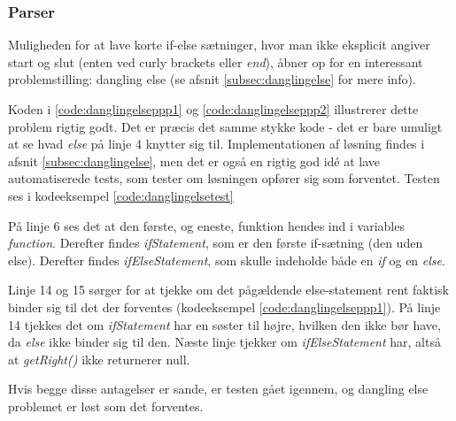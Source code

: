 \subsubsection{Parser}
\label{subsec:parser}

Muligheden for at lave korte if-else sætninger, hvor man ikke eksplicit angiver start og slut (enten ved curly brackets  eller \textit{end}), åbner op for en interessant problemstilling: dangling else (se afsnit \ref{subsec:danglingelse} for mere info). 



\noindent Koden i \ref{code:danglingelseppp1} og \ref{code:danglingelseppp2} illustrerer dette problem rigtig godt. Det er præcis det samme stykke kode - det er bare umuligt at se hvad \textit{else} på linje 4 knytter sig til. Implementationen af løsning findes i afsnit \ref{subsec:danglingelse}, men det er også en rigtig god idé at lave automatiserede tests, som tester om løsningen opfører sig som forventet. Testen ses i kodeeksempel \ref{code:danglingelsetest}


\noindent På linje 6 ses det at den første, og eneste, funktion hendes ind i variables \textit{function}. Derefter findes \textit{ifStatement}, som er den første if-sætning (den uden else). Derefter findes \textit{ifElseStatement}, som skulle indeholde både en \textit{if} og en \textit{else}.

Linje 14 og 15 sørger for at tjekke om det pågældende else-statement rent faktisk binder sig til det der forventes (kodeeksempel \ref{code:danglingelseppp1}). På linje 14 tjekkes det om \textit{ifStatement} har en søster  til højre, hvilken den ikke bør have, da \textit{else} ikke binder sig til den. Næste linje tjekker om \textit{ifElseStatement} har, altså at \textit{getRight()} ikke returnerer null. 

Hvis begge disse antagelser er sande, er testen gået igennem, og dangling else problemet er løst som det forventes.